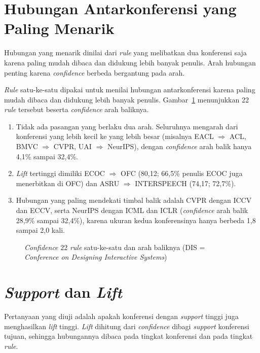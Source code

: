 \section{Hubungan Antarkonferensi yang Paling Menarik}
\label{sec:hasil-t5-menarik}
Hubungan yang menarik dinilai dari \textit{rule} yang melibatkan dua konferensi saja karena paling mudah dibaca dan didukung lebih banyak penulis. Arah hubungan penting karena \textit{confidence} berbeda bergantung pada arah.

\textit{Rule} satu-ke-satu dipakai untuk menilai hubungan antarkonferensi karena paling mudah dibaca dan didukung lebih banyak penulis. Gambar~\ref{fig:t5-arah} menunjukkan 22 \textit{rule} tersebut beserta \textit{confidence} arah baliknya.
\begin{enumerate}
\item Tidak ada pasangan yang berlaku dua arah. Seluruhnya mengarah dari konferensi yang lebih kecil ke yang lebih besar (misalnya EACL $\Rightarrow$ ACL, BMVC $\Rightarrow$ CVPR, UAI $\Rightarrow$ NeurIPS), dengan \textit{confidence} arah balik hanya 4,1\% sampai 32,4\%.
\item \textit{Lift} tertinggi dimiliki ECOC $\Rightarrow$ OFC (80,12; 66,5\% penulis ECOC juga menerbitkan di OFC) dan ASRU $\Rightarrow$ INTERSPEECH (74,17; 72,7\%).
\item Hubungan yang paling mendekati timbal balik adalah CVPR dengan ICCV dan ECCV, serta NeurIPS dengan ICML dan ICLR (\textit{confidence} arah balik 28,9\% sampai 32,4\%), karena ukuran kedua konferensinya hanya berbeda 1,8 sampai 2,0 kali.
\end{enumerate}

\begin{figure}[!htb]
\centering
{}
\caption{\textit{Confidence} 22 \textit{rule} satu-ke-satu dan arah baliknya (DIS = \textit{Conference on Designing Interactive Systems})}
\label{fig:t5-arah}
\end{figure}

\section{\textit{Support} dan \textit{Lift}}
\label{sec:hasil-t5-lift}
Pertanyaan yang diuji adalah apakah konferensi dengan \textit{support} tinggi juga menghasilkan \textit{lift} tinggi. \textit{Lift} dihitung dari \textit{confidence} dibagi \textit{support} konferensi tujuan, sehingga hubungannya dibaca pada tingkat konferensi dan pada tingkat \textit{rule}.

